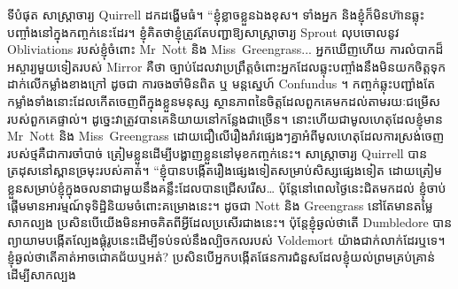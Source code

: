 ទីបំផុត សាស្ត្រាចារ្យ Quirrell ដកដង្ហើមធំ។ “ខ្ញុំ​ខ្លាច​ខ្លួន​ឯង​ខុស។ ទាំងអ្នក និងខ្ញុំក៏មិនហ៊ានឆ្លុះបញ្ចាំងនៅក្នុងកញ្ចក់នេះដែរ។ ខ្ញុំគិតថាខ្ញុំត្រូវតែបញ្ជាឱ្យសាស្រ្តាចារ្យ Sprout លុបចោលនូវ Obliviations របស់ខ្ញុំចំពោះ Mr~Nott និង Miss~Greengrass... អ្នកឃើញហើយ ការលំបាកដ៏អស្ចារ្យមួយទៀតរបស់ Mirror គឺថា ច្បាប់ដែលវាប្រព្រឹត្តចំពោះអ្នកដែលឆ្លុះបញ្ចាំងនឹងមិនយកចិត្តទុកដាក់លើកម្លាំងខាងក្រៅ ដូចជា ការចងចាំមិនពិត ឬ មន្តស្នេហ៍ Confundus ។ កញ្ចក់ឆ្លុះបញ្ជាំងតែកម្លាំងទាំងនោះដែលកើតចេញពីក្នុងខ្លួនមនុស្ស ស្ថានភាពនៃចិត្តដែលពួកគេមកដល់តាមរយៈជម្រើសរបស់ពួកគេផ្ទាល់។ ដូច្នេះវាត្រូវបានគេនិយាយនៅកន្លែងជាច្រើន។ នោះហើយជាមូលហេតុដែលខ្ញុំមាន Mr~Nott និង Miss~Greengrass ដោយជឿលើរឿងរ៉ាវផ្សេងៗគ្នាអំពីមូលហេតុដែលការស្រង់ចេញរបស់ថ្មគឺជាការចាំបាច់ ត្រៀមខ្លួនដើម្បីបង្ហាញខ្លួននៅមុខកញ្ចក់នេះ។ សាស្រ្តាចារ្យ Quirrell បានត្រដុសនៅស្ពានច្រមុះរបស់គាត់។ “ខ្ញុំបានបង្កើតរឿងផ្សេងទៀតសម្រាប់សិស្សផ្សេងទៀត ដោយត្រៀមខ្លួនសម្រាប់ខ្ញុំក្នុងចលនាជាមួយនឹងគន្លឹះដែលបានជ្រើសរើស… ប៉ុន្តែនៅពេលថ្ងៃនេះជិតមកដល់ ខ្ញុំចាប់ផ្តើមមានអារម្មណ៍ទុទិដ្ឋិនិយមចំពោះគម្រោងនេះ។ ដូចជា Nott និង Greengrass នៅតែមានតម្លៃសាកល្បង ប្រសិនបើយើងមិនអាចគិតពីអ្វីដែលប្រសើរជាងនេះ។ ប៉ុន្តែខ្ញុំឆ្ងល់ថាតើ Dumbledore បានព្យាយាមបង្កើតល្បែងផ្គុំរូបនេះដើម្បីទប់ទល់នឹងល្បិចកលរបស់ Voldemort យ៉ាងជាក់លាក់ដែរឬទេ។ ខ្ញុំឆ្ងល់ថាតើគាត់អាចជោគជ័យឬអត់? ប្រសិនបើអ្នកបង្កើតផែនការជំនួសដែលខ្ញុំយល់ព្រមគ្រប់គ្រាន់ដើម្បីសាកល្បង 
